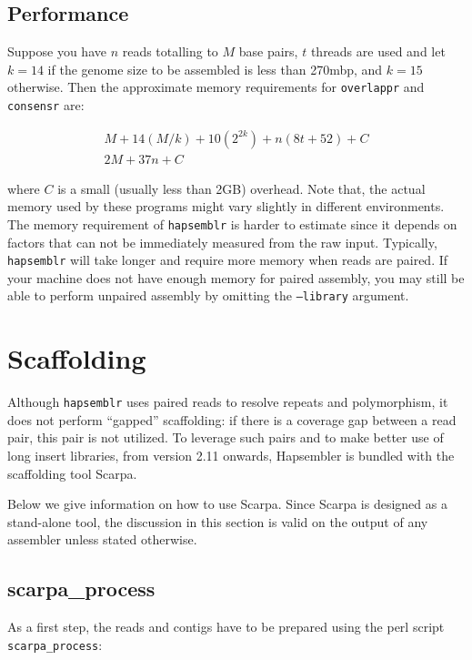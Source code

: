 \documentclass[12pt,a4paper]{report}
\newcommand{\hapversion}{2.11}
\begin{document}
\subsection{Performance}

Suppose you have $n$ reads totalling to $M$ base pairs, $t$ threads are used and let $k=14$ if the genome size to be assembled is less than 270mbp, and $k=15$ otherwise. Then the approximate memory requirements for \texttt{overlappr} and \texttt{consensr} are:

\begin{eqnarray}
M + 14(M/k) + 10(2^{2k}) + n(8t + 52) + C \\
2M + 37n + C
\end{eqnarray}

where $C$ is a small (usually less than 2GB) overhead. Note that, the actual memory used by these programs might vary slightly in different environments. The memory requirement of \texttt{hapsemblr} is harder to estimate since it depends on factors that can not be immediately measured from the raw input. Typically, \texttt{hapsemblr} will take longer and require more memory when reads are paired. If your machine does not have enough memory for paired assembly, you may still be able to perform unpaired assembly by omitting the \texttt{--library} argument.

\section{Scaffolding}
\label{scaff}

Although \texttt{hapsemblr} uses paired reads to resolve repeats and polymorphism, it does not perform ``gapped'' scaffolding: if there is a coverage gap between a read pair, this pair is not utilized. To leverage such pairs and to make better use of long insert libraries, from version \hapversion{} onwards, Hapsembler is bundled with the scaffolding tool Scarpa. 

Below we give information on how to use Scarpa. Since Scarpa is designed as a stand-alone tool, the discussion in this section is valid on the output of any assembler unless stated otherwise.

\subsection{scarpa\_process}

As a first step, the reads and contigs have to be prepared using the perl script \texttt{scarpa\_process}:
\end{document}
